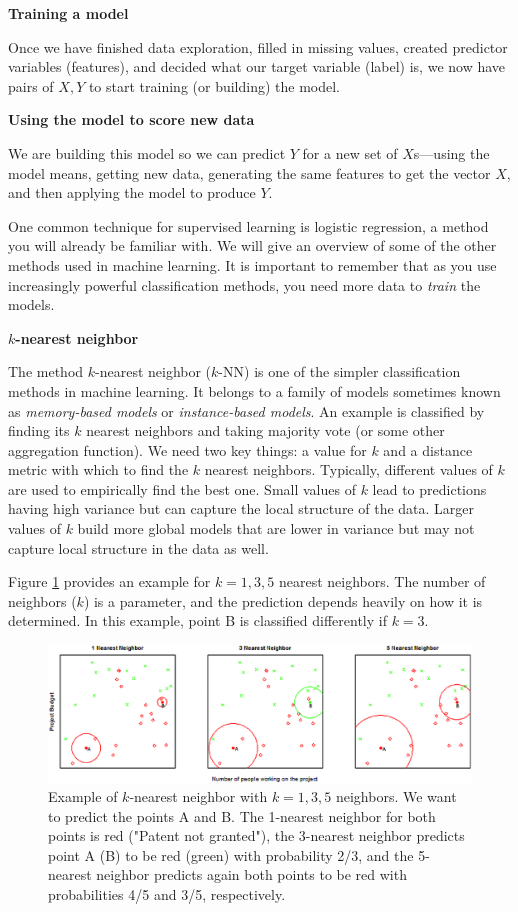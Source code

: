 \documentclass[]{krantz}
\begin{document}
\textbf{Training a model}

Once we have finished data exploration, filled in missing values,
created predictor variables (features), and decided what our target
variable (label) is, we now have pairs of \(X,Y\) to start training (or
building) the model.

\textbf{Using the model to score new data}

We are building this model so we can predict \(Y\) for a new set of
\(X\)s---using the model means, getting new data, generating the same
features to get the vector \(X\), and then applying the model to produce
\(Y\).

One common technique for supervised learning is logistic regression, a
method you will already be familiar with. We will give an overview of
some of the other methods used in machine learning. It is important to
remember that as you use increasingly powerful classification methods,
you need more data to \emph{train} the models.

\textbf{\(k\)-nearest neighbor}

The method \(k\)-nearest neighbor (\(k\)-NN) is one of the simpler
classification methods in machine learning. It belongs to a family of
models sometimes known as \emph{memory-based models} or
\emph{instance-based models}. An example is classified by finding its
\(k\) nearest neighbors and taking majority vote (or some other
aggregation function). We need two key things: a value for \(k\) and a
distance metric with which to find the \(k\) nearest neighbors.
Typically, different values of \(k\) are used to empirically find the
best one. Small values of \(k\) lead to predictions having high variance
but can capture the local structure of the data. Larger values of \(k\)
build more global models that are lower in variance but may not capture
local structure in the data as well.

Figure \ref{fig:knn} provides an example for \(k = 1, 3, 5\) nearest
neighbors. The number of neighbors (\(k\)) is a parameter, and the
prediction depends heavily on how it is determined. In this example,
point B is classified differently if \(k = 3\).

\begin{figure}

{\centering \includegraphics[width=0.7\linewidth]{ChapterML/figures/knn} 

}

\caption{Example of $k$-nearest neighbor with $k = 1, 3, 5$ neighbors. We want to predict the points A and B. The 1-nearest neighbor for both points is red ("Patent not granted"), the 3-nearest neighbor predicts point A (B) to be red (green) with probability 2/3, and the 5-nearest neighbor predicts again both points to be red with probabilities 4/5 and 3/5, respectively.}\label{fig:knn}
\end{figure}
\end{document}
